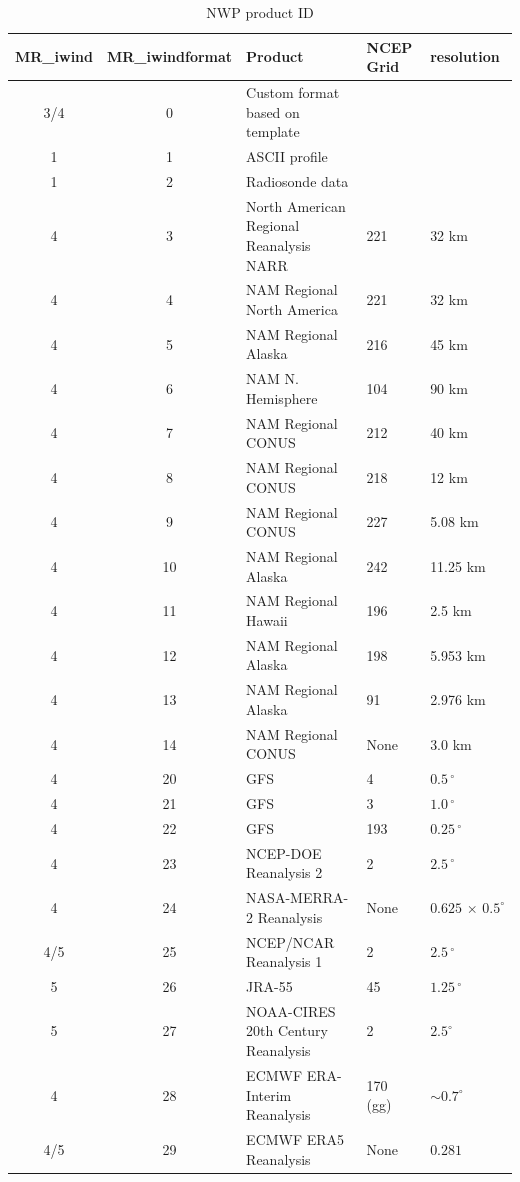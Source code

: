 \documentclass[11pt]{article}   %
\begin{document}
\begin{table}[h]\label{Tabiwf}
\caption{NWP product ID}
\footnotesize
\begin{tabular}{| c | c | l | l | l |}
\hline
MR\_iwind & MR\_iwindformat & Product & NCEP Grid & resolution \\
\hline
3/4 &  0 & Custom format based on template & & \\
1 &  1 & ASCII profile & & \\
1 &  2 & Radiosonde data & & \\
\hline
4 &   3 & North American Regional Reanalysis NARR & 221 & 32 km \\
4 &   4 & NAM Regional North America & 221 & 32 km \\
4 &   5 & NAM Regional Alaska & 216 & 45 km \\
4 &   6 & NAM N. Hemisphere & 104 & 90 km \\
4 &   7 & NAM Regional CONUS & 212 & 40 km \\
4 &   8 & NAM Regional CONUS & 218 & 12 km \\
4 &   9 & NAM Regional CONUS & 227 & 5.08 km \\
4 &  10 & NAM Regional Alaska & 242 & 11.25 km \\
4 &  11 & NAM Regional Hawaii & 196 & 2.5 km \\
4 &  12 & NAM Regional Alaska & 198 & 5.953 km \\
4 &  13 & NAM Regional Alaska & 91 & 2.976 km \\
4 &  14 & NAM Regional CONUS & None & 3.0 km \\
  \hline
4 &  20 & GFS & 4   & $ 0.5 \, ^{\circ}$ \\
4 &  21 & GFS & 3   & $ 1.0 \, ^{\circ}$ \\
4 &  22 & GFS & 193 & $0.25 \, ^{\circ}$ \\
4 &  23 & NCEP-DOE Reanalysis 2 & 2  & $2.5 \, ^{\circ}$ \\
4 &  24 & NASA-MERRA-2 Reanalysis & None & $0.625 \, \times \,0.5^{\circ}$ \\
4/5 &  25 & NCEP/NCAR Reanalysis 1 & 2 & $2.5 \, ^{\circ}$ \\
5 &  26 & JRA-55 & 45 & $1.25 \, ^{\circ}$ \\
5 &  27 & NOAA-CIRES 20th Century Reanalysis & 2 & $2.5^{\circ}$ \\
4 &  28 & ECMWF ERA-Interim Reanalysis & 170 (gg) & $\sim 0.7^{\circ}$ \\
4/5 &  29 & ECMWF ERA5 Reanalysis & None & $0.281$ \\

\end{tabular}
\end{table}
\end{document}
